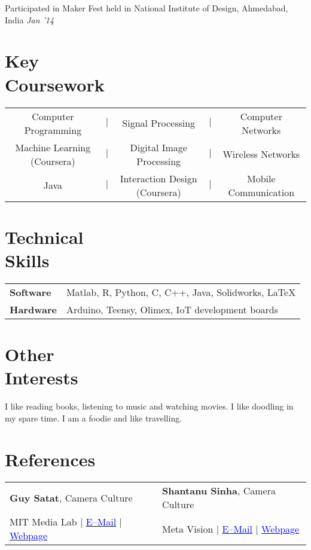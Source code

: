 \documentclass[margin,line]{res}
\begin{document}
\begin{resume}
{Participated in Maker Fest held in National Institute of Design, Ahmedabad, India} \hfill {\textit{Jan '14}}

\section{\sc Key \\Coursework}
\begin{tabular}{ccccc}
Computer Programming & $|$ & Signal Processing & $|$ & Computer Networks \\
Machine Learning (Coursera) & $|$ & Digital Image Processing & $|$ & Wireless Networks \\
Java & $|$ & Interaction Design (Coursera) & $|$ & Mobile Communication
\end{tabular}

\section{\sc Technical \\Skills}
\begin{tabular}{@{}p{1.3in}p{4.3in}}
\textbf{Software} & Matlab, R, Python, C, C++, Java, Solidworks, \LaTeX \\
\vspace*{-0.06in}
\textbf{Hardware} &
\vspace*{-0.06in}
Arduino, Teensy, Olimex, IoT development boards \\
\end{tabular}

\section{\sc Other \\Interests}
\lettrine[lines=2]{I}{} like reading books, listening to music and watching movies. I like doodling in my spare time. I am a foodie and like travelling.

\section{\sc References}
\begin{tabular}{@{}p{3in}p{3in}}
\textbf{Guy Satat}, Camera Culture & \textbf{Shantanu Sinha}, Camera Culture \\
MIT Media Lab $|$ \href{mailto:guysatat@mit.edu}{\textcolor{blue}{E--Mail}} $|$ \href{http://web.media.mit.edu/~guysatat/}{\textcolor{blue}{Webpage}} & Meta Vision $|$ \href{mailto:s.sinha@metavision.com}{\textcolor{blue}{E--Mail}} $|$ \href{https://www.media.mit.edu/~sssinha}{\textcolor{blue}{Webpage}} \\
\end{tabular}
\vspace{-0.15in}


\end{resume}
\end{document}
